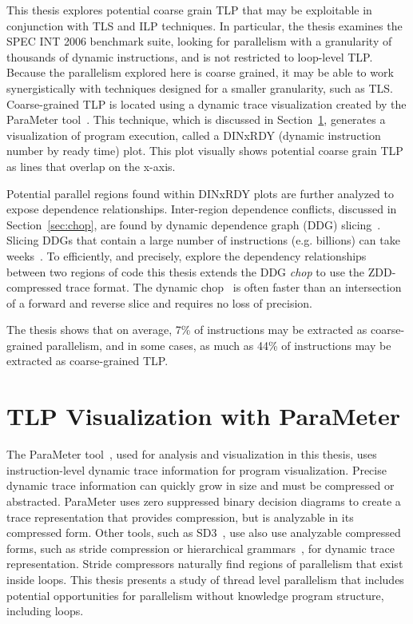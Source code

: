 \documentclass[defaultstyle,11pt]{thesis}
\begin{document}
This thesis explores potential coarse grain TLP that may be
exploitable in conjunction with TLS and ILP techniques.  In
particular, the thesis examines the SPEC INT 2006 benchmark suite,
looking for parallelism with a granularity of thousands of dynamic
instructions, and is not restricted to loop-level TLP.  Because the
parallelism explored here is coarse grained, it may be able to work
synergistically with techniques designed for a smaller granularity,
such as TLS. Coarse-grained TLP is located using a dynamic trace
visualization created by the ParaMeter tool~\cite{price:08:pact}.
This technique, which is discussed in Section~\ref{sec:parameter},
generates a visualization of program execution, called a DINxRDY
(dynamic instruction number by ready time) plot.  This plot visually
shows potential coarse grain TLP as lines that overlap on the x-axis.

Potential parallel regions found within DINxRDY plots are further
analyzed to expose dependence relationships.  Inter-region dependence
conflicts, discussed in Section~\ref{sec:chop}, are found by dynamic
dependence graph (DDG)
slicing~\cite{gallager:91:se,agrawal:90:pldi,agrawal:92:thesis,korel:88:ipl}.
Slicing DDGs that contain a large number of instructions
(e.g. billions) can take weeks~\cite{agrawal:90:pldi, zhang:03:icse}.
To efficiently, and precisely, explore the dependency relationships
between two regions of code this thesis extends the DDG \textit{chop}
to use the ZDD-compressed trace format.  The dynamic
chop~\cite{gupta:2005:ase, krinke:2004:sqc} is often faster than an
intersection of a forward and reverse slice and requires no loss of
precision.

The thesis shows that on average, 7\% of instructions may be extracted
as coarse-grained parallelism, and in some cases, as much as 44\% of
instructions may be extracted as coarse-grained TLP.

\section{TLP Visualization with ParaMeter}
\label{sec:parameter}

The ParaMeter tool~\cite{price:08:pact}, used for analysis and
visualization in this thesis, uses instruction-level dynamic trace
information for program visualization.  Precise dynamic trace
information can quickly grow in size and must be compressed or
abstracted.  ParaMeter uses zero suppressed binary decision diagrams
to create a trace representation that provides compression, but is
analyzable in its compressed form.  Other tools, such as
SD3~\cite{minjang:10:micro}, use also use analyzable compressed forms,
such as stride compression or hierarchical
grammars~\cite{larus:99:pldi}, for dynamic trace representation.
Stride compressors naturally find regions of parallelism that exist
inside loops.  This thesis presents a study of thread level
parallelism that includes potential opportunities for parallelism
without knowledge program structure, including loops.
\end{document}
